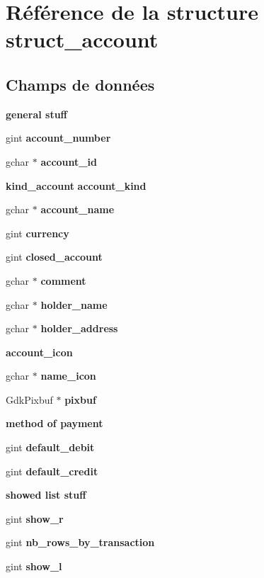 \section{Référence de la structure struct\_\-account}
\label{structstruct__account}
\subsection*{Champs de données}
\begin{Indent}{\bf general stuff}\par
{\em \label{_amgrp52b07cac44d92ce9f787d506234f1ad4}
 }\begin{DoxyCompactItemize}
\item 
gint {\bf account\_\-number}
\item 
gchar $\ast$ {\bf account\_\-id}
\item 
{\bf kind\_\-account} {\bf account\_\-kind}
\item 
gchar $\ast$ {\bf account\_\-name}
\item 
gint {\bf currency}
\item 
gint {\bf closed\_\-account}
\item 
gchar $\ast$ {\bf comment}
\item 
gchar $\ast$ {\bf holder\_\-name}
\item 
gchar $\ast$ {\bf holder\_\-address}
\end{DoxyCompactItemize}
\end{Indent}
\begin{Indent}{\bf account\_\-icon}\par
{\em \label{_amgrp625348a0eed2a2b4b14f8ce9caacd4f4}
 }\begin{DoxyCompactItemize}
\item 
gchar $\ast$ {\bf name\_\-icon}
\item 
GdkPixbuf $\ast$ {\bf pixbuf}
\end{DoxyCompactItemize}
\end{Indent}
\begin{Indent}{\bf method of payment}\par
{\em \label{_amgrpbbdbbfa765cb9005b09822cb581df3b1}
 }\begin{DoxyCompactItemize}
\item 
gint {\bf default\_\-debit}
\item 
gint {\bf default\_\-credit}
\end{DoxyCompactItemize}
\end{Indent}
\begin{Indent}{\bf showed list stuff}\par
{\em \label{_amgrp40f165dffdf7a52c0173ec34c8907ab4}
 }\begin{DoxyCompactItemize}
\item 
gint {\bf show\_\-r}
\item 
gint {\bf nb\_\-rows\_\-by\_\-transaction}
\item 
gint {\bf show\_\-l}
\end{DoxyCompactItemize}
\end{Indent}
